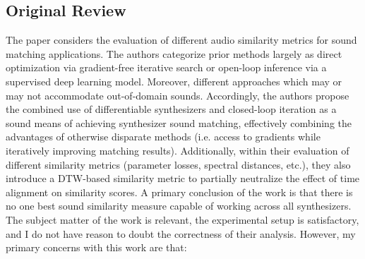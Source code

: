 \documentclass[11pt]{article}
\begin{document}
\subsection{Original Review}
\noindent
The paper considers the evaluation of different audio similarity metrics for sound matching applications.  The authors categorize prior methods largely as direct optimization via gradient-free iterative search or open-loop inference via a supervised deep learning model.  Moreover, different approaches which may or may not accommodate out-of-domain sounds.  Accordingly, the authors propose the combined use of differentiable synthesizers and closed-loop iteration as a sound means of achieving synthesizer sound matching, effectively combining the advantages of otherwise disparate methods (i.e. access to gradients while iteratively improving matching results).  Additionally, within their evaluation of different similarity metrics (parameter losses, spectral distances, etc.), they also introduce a DTW-based similarity metric to partially neutralize the effect of time alignment on similarity scores.  A primary conclusion of the work is that there is no one best sound similarity measure capable of working across all synthesizers.  \\
The subject matter of the work is relevant, the experimental setup is satisfactory, and I do not have reason to doubt the correctness of their analysis.  However, my primary concerns with this work are that:  
\end{document}
